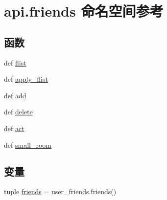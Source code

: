 \hypertarget{namespaceapi_1_1friends}{\section{api.\-friends 命名空间参考}
\label{namespaceapi_1_1friends}
}
\subsection*{函数}
\begin{DoxyCompactItemize}
\item 
def \hyperlink{namespaceapi_1_1friends_a33e4d27a1d6519432e56dd938d0c3968}{flist}
\item 
def \hyperlink{namespaceapi_1_1friends_abeaa11aa664f5dfe0cfb0a27b5c79853}{apply\-\_\-flist}
\item 
def \hyperlink{namespaceapi_1_1friends_a769e827afc0e3129a7dead2fb329d885}{add}
\item 
def \hyperlink{namespaceapi_1_1friends_ade746c4674003c816a4fd090ecb64870}{delete}
\item 
def \hyperlink{namespaceapi_1_1friends_aecc19077d22451763ec7dea3418b2b96}{act}
\item 
def \hyperlink{namespaceapi_1_1friends_a1ba0ce7b06c7b1499f76e1d94f971cae}{small\-\_\-room}
\end{DoxyCompactItemize}
\subsection*{变量}
\begin{DoxyCompactItemize}
\item 
tuple \hyperlink{namespaceapi_1_1friends_a1066d60affc1ff609cc3828da439c9ff}{friends} = user\-\_\-friends.\-friends()
\end{DoxyCompactItemize}


